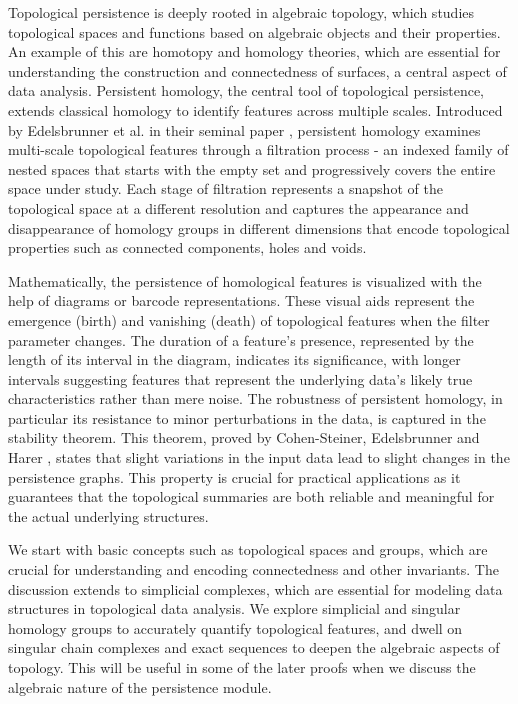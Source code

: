 Topological persistence is deeply rooted in algebraic topology, which studies topological spaces and functions based on algebraic objects and their properties. An example of this are homotopy and homology theories, which are essential for understanding the construction and connectedness of surfaces, a central aspect of data analysis. Persistent homology, the central tool of topological persistence, extends classical homology to identify features across multiple scales. Introduced by Edelsbrunner et al. in their seminal paper \cite{edelsbrunner2000triangulations}, persistent homology examines multi-scale topological features through a filtration process - an indexed family of nested spaces that starts with the empty set and progressively covers the entire space under study. Each stage of filtration represents a snapshot of the topological space at a different resolution and captures the appearance and disappearance of homology groups in different dimensions that encode topological properties such as connected components, holes and voids.

Mathematically, the persistence of homological features is visualized with the help of diagrams or barcode representations. These visual aids represent the emergence (birth) and vanishing (death) of topological features when the filter parameter changes. The duration of a feature's presence, represented by the length of its interval in the diagram, indicates its significance, with longer intervals suggesting features that represent the underlying data's likely true characteristics rather than mere noise. The robustness of persistent homology, in particular its resistance to minor perturbations in the data, is captured in the stability theorem. This theorem, proved by Cohen-Steiner, Edelsbrunner and Harer \cite{bendich2007inferring}, states that slight variations in the input data lead to slight changes in the persistence graphs. This property is crucial for practical applications as it guarantees that the topological summaries are both reliable and meaningful for the actual underlying structures.

We start with basic concepts such as topological spaces and groups, which are crucial for understanding and encoding connectedness and other invariants. The discussion extends to simplicial complexes, which are essential for modeling data structures in topological data analysis. We explore simplicial and singular homology groups to accurately quantify topological features, and dwell on singular chain complexes and exact sequences to deepen the algebraic aspects of topology. This will be useful in some of the later proofs when we discuss the algebraic nature of the persistence module.

